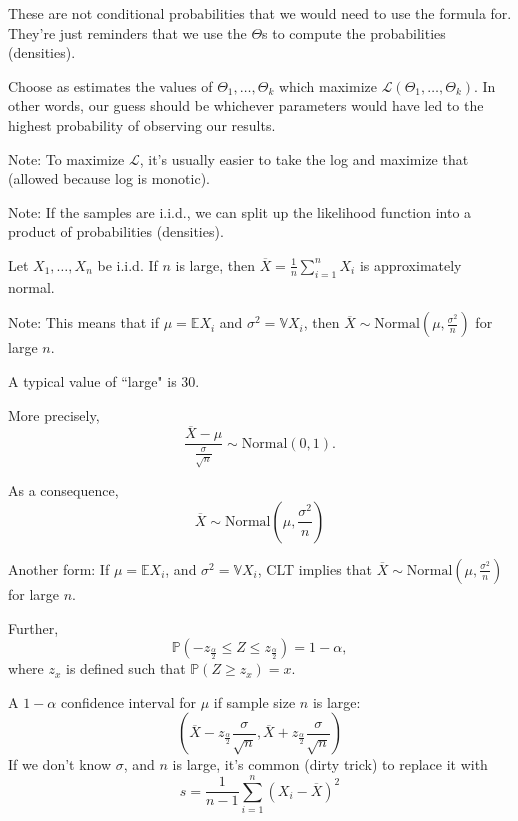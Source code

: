 \documentclass{article}
\begin{document}
    These are not conditional probabilities that we would need to use the formula for. They're just reminders that we use the $\Theta$s to compute the probabilities (densities).

\medskip
{}

    Choose as estimates the values of $\Theta_1, \hdots, \Theta_k$ which maximize $\mathcal L(\Theta_1, \hdots, \Theta_k)$. In other words, our guess should be whichever parameters would have led to the highest probability of observing our results.

    Note: To maximize $\mathcal L$, it's usually easier to take the log and maximize that (allowed because log is monotic).

    Note: If the samples are i.i.d., we can split up the likelihood function into a product of probabilities (densities).

\medskip
{}

    Let $X_1, \hdots, X_n$ be i.i.d. If $n$ is large, then $\overline X = \frac1n\sum\limits_{i=1}^nX_i$ is approximately normal.

    Note: This means that if $\mu = \mathbb EX_i$ and $\sigma^2 = \mathbb VX_i$, then $\overline X \sim \text{Normal}(\mu, \frac{\sigma^2}n)$ for large $n$.

    A typical value of ``large" is 30.

    More precisely, \[\frac{\overline X - \mu}{\frac{\sigma}{\sqrt n}} \sim \text{Normal}(0,1).\]

    As a consequence, \[\overline X \sim \text{Normal}\left(\mu, \frac{\sigma^2}{n}\right)\]

    Another form: If $\mu = \mathbb EX_i$, and $\sigma^2 = \mathbb VX_i$, CLT implies that $\overline X \sim \text{Normal}(\mu, \frac{\sigma^2}n)$ for large $n$.

    Further, \[\mathbb P\left(-z_{\frac\alpha2} \leq Z \leq z_{\frac\alpha2}\right) = 1 - \alpha,\] where $z_x$ is defined such that $\mathbb P(Z \geq z_x) = x$.

\medskip
{}

    A $1 - \alpha$ confidence interval for $\mu$ if sample size $n$ is large:
    \[\left(\overline X - z_{\frac\alpha2}\frac\sigma{\sqrt n}, \overline X + z_{\frac\alpha2}\frac\sigma{\sqrt n}\right)\]
    If we don't know $\sigma$, and $n$ is large, it's common (dirty trick) to replace it with $$s = \frac1{n-1}\sum_{i=1}^n(X_i - \overline X)^2$$
\end{document}
